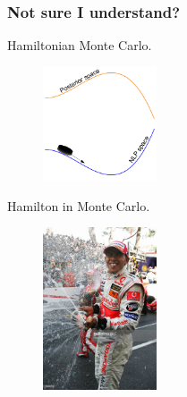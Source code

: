 \documentclass[handout]{beamer}
\begin{document}
\begin{frame}
	\frametitle{Not sure I understand?}
	Hamiltonian Monte Carlo.
	
	\begin{figure}[ht]
		\centerline{\includegraphics[width=0.3\textwidth]{animations_figures/lec5_icePuck.pdf}}
	\end{figure}
	
	Hamilton in Monte Carlo.
	
	\begin{figure}[ht]
		\centerline{\includegraphics[width=0.3\textwidth]{animations_figures/hamiltonMonteCarlo1.jpg}}
	\end{figure}
	
	
\end{frame}
\end{document}
